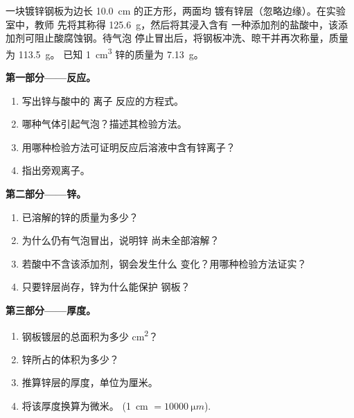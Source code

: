 \begin{problem}
\label{pb:g9:metals-acids-corrosion:1}
一块镀锌钢板为边长 \qty{10.0}{cm} 的正方形，两面均
镀有锌层（忽略边缘）。在实验室中，教师
先将其称得 \qty{125.6}{g}，然后将其浸入含有
一种添加剂的盐酸中，该添加剂可阻止酸腐蚀钢。待气泡
停止冒出后，将钢板冲洗、晾干并再次称量，质量为 \qty{113.5}{g}。
已知 \qty{1}{cm^3} 锌的质量为 \qty{7.13}{g}。

\medskip
\noindent\textbf{第一部分——反应。}
\begin{enumerate}
  \item 写出锌与酸中的  离子
        反应的方程式。
  \item 哪种气体引起气泡？描述其检验方法。
  \item 用哪种检验方法可证明反应后溶液中含有锌离子？
  \item 指出旁观离子。
\end{enumerate}

\medskip
\noindent\textbf{第二部分——锌。}
\begin{enumerate}[resume]
  \item 已溶解的锌的质量为多少？
  \item 为什么仍有气泡冒出，说明锌
        尚未全部溶解？
  \item 若酸中不含该添加剂，钢会发生什么
        变化？用哪种检验方法证实？
  \item 只要锌层尚存，锌为什么能保护
        钢板？
\end{enumerate}

\medskip
\noindent\textbf{第三部分——厚度。}
\begin{enumerate}[resume]
  \item 钢板镀层的总面积为多少 \unit{cm^2}？
  \item 锌所占的体积为多少？
  \item 推算锌层的厚度，单位为厘米。
  \item 将该厚度换算为微米。
        (\qty{1}{cm} $= \qty{10000}{\micro m}$).
\end{enumerate}
\end{problem}
